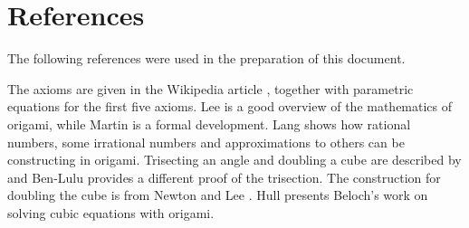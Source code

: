 
\chapter*{References}\label{c.ref}

The following references were used in the preparation of this document.

The axioms are given in the Wikipedia article \cite{hh}, together with parametric equations for the first five axioms. Lee \cite[Chapter~4]{hwa} is a good overview of the mathematics of origami, while Martin \cite[Chapter~10]{martin} is a formal development. Lang \cite{lang} shows how rational numbers, some irrational numbers and approximations to others can be constructing in origami. Trisecting an angle and doubling a cube are described by \cite{newton} and Ben-Lulu \cite{oriah} provides a different proof of the trisection. The construction for doubling the cube is from Newton \cite{newton} and Lee \cite{hwa}. Hull \cite{hull-beloch} presents Beloch's work on solving cubic equations with origami.

\begingroup
\renewcommand\bibname{}
\let\clearpage\relax
\vspace{-4ex}


\endgroup